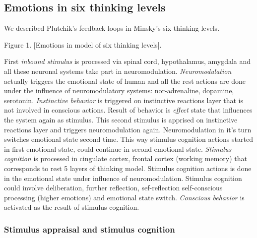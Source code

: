 \subsection{Emotions in six thinking levels}

We described Plutchik's feedback loops\cite{natureofemotions} in Minsky's six thinking levels.

Figure 1. [Emotions in model of six thinking levels].

First \emph{inbound stimulus} is processed via spinal cord, hypothalamus, amygdala and all these neuronal systems take part in neuromodulation. 
\emph{Neuromodulation} actually triggers the emotional state of human and all the rest actions are done under the influence of neuromodulatory systems: nor-adrenaline, dopamine, serotonin. 
\emph{Instinctive behavior} is triggered on instinctive reactions layer that is not involved in conscious actions. 
Result of behavior is \emph{effect} state that influences the system again as stimulus. This second stimulus is apprised on instinctive reactions layer and triggers neuromodulation again. Neuromodulation in it's turn switches emotional state second time. This way stimulus cognition actions started in first emotional state, could continue in second emotional state. 
\emph{Stimulus cognition} is processed in cingulate cortex, frontal cortex (working memory) that corresponds to rest 5 layers of thinking model. Stimulus cognition actions is done in the emotional state under influence of neuromodulation. Stimulus cognition could involve deliberation, further reflection, sef-reflection self-conscious processing (higher emotions) and  emotional state switch.
\emph{Conscious behavior} is activated as the result of stimulus cognition.

\subsubsection{Stimulus appraisal and stimulus cognition}

